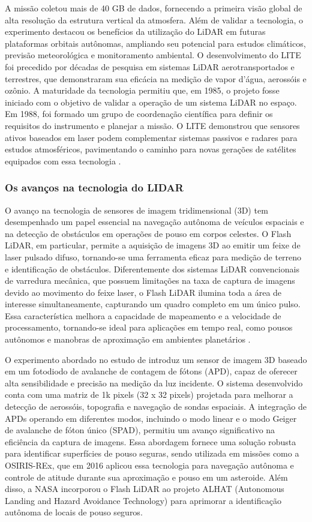 A missão coletou mais de 40 GB de dados, fornecendo a primeira visão global de alta resolução da estrutura vertical da atmosfera. Além de validar a tecnologia, o experimento destacou os benefícios da utilização do LiDAR em futuras plataformas orbitais autônomas, ampliando seu potencial para estudos climáticos, previsão meteorológica e monitoramento ambiental. O desenvolvimento do LITE foi precedido por décadas de pesquisa em sistemas LiDAR aerotransportados e terrestres, que demonstraram sua eficácia na medição de vapor d'água, aerossóis e ozônio. A maturidade da tecnologia permitiu que, em 1985, o projeto fosse iniciado com o objetivo de validar a operação de um sistema LiDAR no espaço. Em 1988, foi formado um grupo de coordenação científica para definir os requisitos do instrumento e planejar a missão. O LITE demonstrou que sensores ativos baseados em laser podem complementar sistemas passivos e radares para estudos atmosféricos, pavimentando o caminho para novas gerações de satélites equipados com essa tecnologia \cite{winker1996}.

\subsubsection{Os avanços na tecnologia do LIDAR}

O avanço na tecnologia de sensores de imagem tridimensional (3D) tem desempenhado um papel essencial na navegação autônoma de veículos espaciais e na detecção de obstáculos em operações de pouso em corpos celestes. O Flash LiDAR, em particular, permite a aquisição de imagens 3D ao emitir um feixe de laser pulsado difuso, tornando-se uma ferramenta eficaz para medição de terreno e identificação de obstáculos. Diferentemente dos sistemas LiDAR convencionais de varredura mecânica, que possuem limitações na taxa de captura de imagens devido ao movimento do feixe laser, o Flash LiDAR ilumina toda a área de interesse simultaneamente, capturando um quadro completo em um único pulso. Essa característica melhora a capacidade de mapeamento e a velocidade de processamento, tornando-se ideal para aplicações em tempo real, como pousos autônomos e manobras de aproximação em ambientes planetários \cite{mizuno2020}.

O experimento abordado no estudo de \cite{mizuno2020} introduz um sensor de imagem 3D baseado em um fotodiodo de avalanche de contagem de fótons (APD), capaz de oferecer alta sensibilidade e precisão na medição da luz incidente. O sistema desenvolvido conta com uma matriz de 1k pixels (32 x 32 pixels) projetada para melhorar a detecção de aerossóis, topografia e navegação de sondas espaciais. A integração de APDs operando em diferentes modos, incluindo o modo linear e o modo Geiger de avalanche de fóton único (SPAD), permitiu um avanço significativo na eficiência da captura de imagens. Essa abordagem fornece uma solução robusta para identificar superfícies de pouso seguras, sendo utilizada em missões como a OSIRIS-REx, que em 2016 aplicou essa tecnologia para navegação autônoma e controle de atitude durante sua aproximação e pouso em um asteroide. Além disso, a NASA incorporou o Flash LiDAR ao projeto ALHAT (Autonomous Landing and Hazard Avoidance Technology) para aprimorar a identificação autônoma de locais de pouso seguros.

